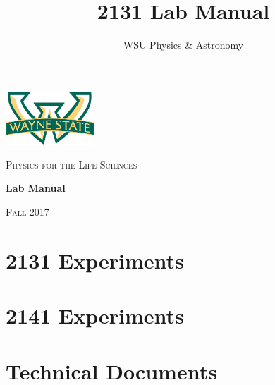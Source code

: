 \documentclass[hidelinks,12pt,letterpaper,twoside]{book}
\author{WSU Physics \& Astronomy}
\title{2131 Lab Manual}
\newcommand\blankpage{%
    \null
    \thispagestyle{empty}%
    \newpage}
\begin{document}
\begin{titlepage}
	\centering
	\includegraphics[width=0.25\textwidth]{wsu_logo}\par\vspace{1cm}
	{\scshape\LARGE Physics for the Life Sciences \par}	
	\vfill
	\textbf{\huge Lab Manual} \par
	\vfill
	{\scshape\large Fall 2017 \par}
\end{titlepage}

\newpage{\blankpage}



\newpage{\blankpage}

\renewcommand\contentsname{Physics for the Life Sciences}
\setcounter{tocdepth}{1}
\tableofcontents{\thispagestyle{fancy}}


\part{2131 Experiments}
\renewcommand{\chaptername}{Experiment}






\part{2141 Experiments}
\setcounter{chapter}{5}

\newpage{\blankpage}






\part{Technical Documents}
\renewcommand{\chaptername}{Technical Document}
\renewcommand\thechapter{\Alph{chapter}}
\newpage{\blankpage}
\newpage{\blankpage}
\newpage{\blankpage}
\newpage{\blankpage}
\newpage{\blankpage}
\end{document}
